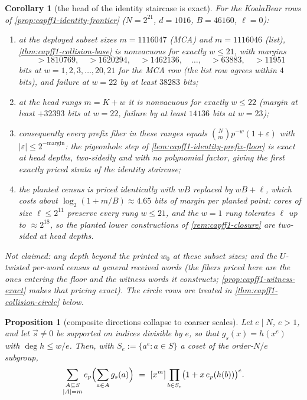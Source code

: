 \documentclass[11pt]{article}
\newtheorem{proposition}[proposition]{Proposition}
\newtheorem{corollary}[corollary]{Corollary}
\theoremstyle{definition}
\theoremstyle{remark}
\begin{document}
\begin{corollary}[the head of the identity staircase is exact]\label{cor:capff1-collision-head}
For the KoalaBear rows of \cref{prop:capff1-identity-frontier} \textup{($N=2^{21}$, $d=1016$, $B=46160$, $\ell=0$)}:
\begin{enumerate}[label=\textup{(\alph*)}]
\item at the deployed subset sizes $m=1116047$ \textup{(MCA)} and $m=1116046$ \textup{(list)}, \cref{thm:capff1-collision-base} is nonvacuous for exactly $w\le21$, with margins
\[
>1810769,\quad >1620294,\quad >1462136,\quad \ldots,\quad >63883,\quad >11951
\]
bits at $w=1,2,3,\ldots,20,21$ for the MCA row \textup{(the list row agrees within $4$ bits)}, and failure at $w=22$ by at least $38283$ bits;
\item at the head rungs $m=K+w$ it is nonvacuous for exactly $w\le22$ \textup{(margin at least $+32393$ bits at $w=22$, failure by at least $14136$ bits at $w=23$)};
\item consequently every prefix fiber in these ranges equals $\binom Nm p^{-w}(1+\varepsilon)$ with $|\varepsilon|\le2^{-\mathrm{margin}}$: the pigeonhole step of \cref{lem:capff1-identity-prefix-floor} is \emph{exact} at head depths, two-sidedly and with no polynomial factor, giving the first exactly priced strata of the identity staircase;
\item the planted census is priced identically with $wB$ replaced by $wB+\ell$, which costs about $\log_2(1+m/B)\approx4.65$ bits of margin per planted point: cores of size $\ell\le2^{11}$ preserve every rung $w\le21$, and the $w=1$ rung tolerates $\ell$ up to $\approx2^{18}$, so the planted lower constructions of \cref{rem:capff1-closure} are two-sided at head depths.
\end{enumerate}
Not claimed: any depth beyond the printed $w_0$ at these subset sizes; and the $U$-twisted per-word census at general received words \textup{(the fibers priced here are the ones entering the floor and the witness words it constructs; \cref{prop:capff1-witness-exact} makes that pricing exact)}.  The circle rows are treated in \cref{thm:capff1-collision-circle} below.
\end{corollary}

\begin{proposition}[composite directions collapse to coarser scales]\label{prop:capff1-composite}
Let $e\mid N$, $e>1$, and let $\vec s\ne0$ be supported on indices divisible by $e$, so that $g_s(x)=h(x^e)$ with $\deg h\le w/e$.  Then, with $S_e:=\{a^e:a\in S\}$ a coset of the order-$N/e$ subgroup,
\[
        \sum_{\substack{A\subseteq S\\|A|=m}}e_p\Bigl(\sum_{a\in A}g_s(a)\Bigr)
        \ =\ [x^m]\prod_{b\in S_e}\bigl(1+x\,e_p(h(b))\bigr)^{e}.
\]
\end{proposition}
\end{document}
